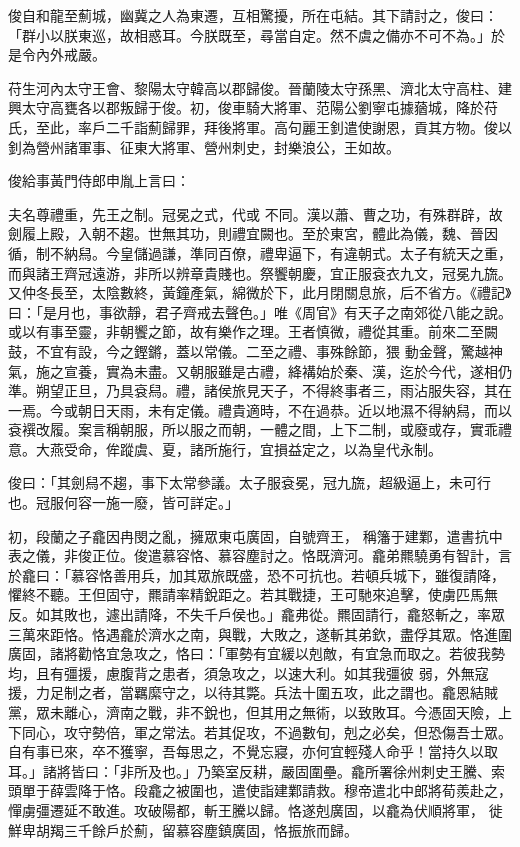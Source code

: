 \begin{pinyinscope}
 俊自和龍至薊城，幽冀之人為東遷，互相驚擾，所在屯結。其下請討之，俊曰：「群小以朕東巡，故相惑耳。今朕既至，尋當自定。然不虞之備亦不可不為。」於是令內外戒嚴。



 苻生河內太守王會、黎陽太守韓高以郡歸俊。晉蘭陵太守孫黑、濟北太守高柱、建興太守高甕各以郡叛歸于俊。初，俊車騎大將軍、范陽公劉寧屯據蕕城，降於苻氏，至此，率戶二千詣薊歸罪，拜後將軍。高句麗王釗遣使謝恩，貢其方物。俊以釗為營州諸軍事、征東大將軍、營州刺史，封樂浪公，王如故。



 俊給事黃門侍郎申胤上言曰：



 夫名尊禮重，先王之制。冠冕之式，代或
 不同。漢以蕭、曹之功，有殊群辟，故劍履上殿，入朝不趨。世無其功，則禮宜闕也。至於東宮，體此為儀，魏、晉因循，制不納舄。今皇儲過謙，準同百僚，禮卑逼下，有違朝式。太子有統天之重，而與諸王齊冠遠游，非所以辨章貴賤也。祭饗朝慶，宜正服袞衣九文，冠冕九旒。又仲冬長至，太陰數終，黃鐘產氣，綿微於下，此月閉關息旅，后不省方。《禮記》曰：「是月也，事欲靜，君子齊戒去聲色。」唯《周官》有天子之南郊從八能之說。或以有事至靈，非朝饗之節，故有樂作之理。王者慎微，禮從其重。前來二至闕鼓，不宜有設，今之鏗鏘，蓋以常儀。二至之禮、事殊餘節，猥
 動金聲，驚越神氣，施之宣養，實為未盡。又朝服雖是古禮，絳褠始於秦、漢，迄於今代，遂相仍準。朔望正旦，乃具袞舄。禮，諸侯旅見天子，不得終事者三，雨沾服失容，其在一焉。今或朝日天雨，未有定儀。禮貴適時，不在過恭。近以地濕不得納舄，而以袞襈改履。案言稱朝服，所以服之而朝，一體之間，上下二制，或廢或存，實乖禮意。大燕受命，侔蹤虞、夏，諸所施行，宜損益定之，以為皇代永制。



 俊曰：「其劍舄不趨，事下太常參議。太子服袞冕，冠九旒，超級逼上，未可行也。冠服何容一施一廢，皆可詳定。」



 初，段蘭之子龕因冉閔之亂，擁眾東屯廣固，自號齊王，
 稱籓于建鄴，遣書抗中表之儀，非俊正位。俊遣慕容恪、慕容塵討之。恪既濟河。龕弟羆驍勇有智計，言於龕曰：「慕容恪善用兵，加其眾旅既盛，恐不可抗也。若頓兵城下，雖復請降，懼終不聽。王但固守，羆請率精銳距之。若其戰捷，王可馳來追擊，使虜匹馬無反。如其敗也，遽出請降，不失千戶侯也。」龕弗從。羆固請行，龕怒斬之，率眾三萬來距恪。恪遇龕於濟水之南，與戰，大敗之，遂斬其弟欽，盡俘其眾。恪進圍廣固，諸將勸恪宜急攻之，恪曰：「軍勢有宜緩以剋敵，有宜急而取之。若彼我勢均，且有彊援，慮腹背之患者，須急攻之，以速大利。如其我彊彼
 弱，外無寇援，力足制之者，當羈縻守之，以待其斃。兵法十圍五攻，此之謂也。龕恩結賊黨，眾未離心，濟南之戰，非不銳也，但其用之無術，以致敗耳。今憑固天險，上下同心，攻守勢倍，軍之常法。若其促攻，不過數旬，剋之必矣，但恐傷吾士眾。自有事已來，卒不獲寧，吾每思之，不覺忘寢，亦何宜輕殘人命乎！當持久以取耳。」諸將皆曰：「非所及也。」乃築室反耕，嚴固圍壘。龕所署徐州刺史王騰、索頭單于薛雲降于恪。段龕之被圍也，遣使詣建鄴請救。穆帝遣北中郎將荀羨赴之，憚虜彊遷延不敢進。攻破陽都，斬王騰以歸。恪遂剋廣固，以龕為伏順將軍，
 徙鮮卑胡羯三千餘戶於薊，留慕容塵鎮廣固，恪振旅而歸。




\end{pinyinscope}
